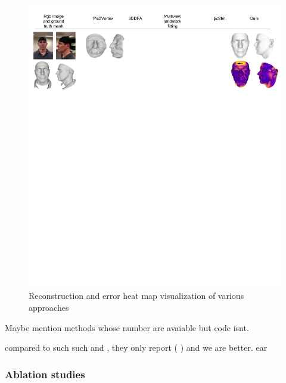 \documentclass[10pt,twocolumn,letterpaper]{article}
\begin{document}
\begin{figure}
\begin{center}
   \includegraphics[width=0.95\linewidth]{images/ICCV_verticals.png}
\end{center}
  \caption{Reconstruction and error heat map visualization of various approaches}
\label{fig:results}
\end{figure}


Maybe mention methods whose number are avaiable but code isnt.

compared to such such and , they only report ( ) and we are better. 
ear     
\subsubsection{Ablation studies}
\end{document}
